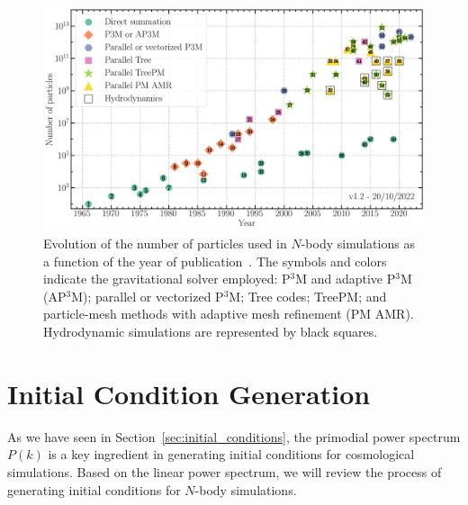 \begin{figure} \centering \includegraphics[width=\textwidth]{figures/Moore_law_cosmosims.png} \caption[Evolution of the number of particles used in $N$-body simulations]{Evolution of the number of particles used in $N$-body simulations as a function of the year of publication~\citep{leclercq2020}. The symbols and colors indicate the gravitational solver employed: P$^3$M and adaptive P$^3$M (AP$^3$M); parallel or vectorized P$^3$M; Tree codes; TreePM; and particle-mesh methods with adaptive mesh refinement (PM AMR). Hydrodynamic simulations are represented by black squares.} \label{fig:particle-count} \end{figure}

\section{Initial Condition Generation}
As we have seen in Section~\ref{sec:initial_conditions}, the primodial power spectrum $P(k)$ is a key ingredient in generating initial conditions for cosmological simulations. Based on the linear power spectrum, we will review the process of generating initial conditions for $N$-body simulations.

